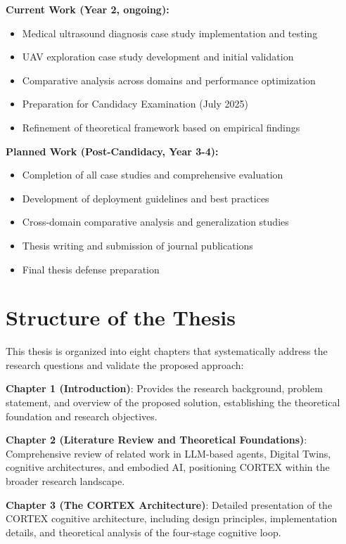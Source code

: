 \textbf{Current Work (Year 2, ongoing):}
\begin{itemize}
    \item Medical ultrasound diagnosis case study implementation and testing
    \item UAV exploration case study development and initial validation
    \item Comparative analysis across domains and performance optimization
    \item Preparation for Candidacy Examination (July 2025)
    \item Refinement of theoretical framework based on empirical findings
\end{itemize}

\textbf{Planned Work (Post-Candidacy, Year 3-4):}
\begin{itemize}
    \item Completion of all case studies and comprehensive evaluation
    \item Development of deployment guidelines and best practices
    \item Cross-domain comparative analysis and generalization studies
    \item Thesis writing and submission of journal publications
    \item Final thesis defense preparation
\end{itemize}

\section{Structure of the Thesis}

This thesis is organized into eight chapters that systematically address the research questions and validate the proposed approach:

\textbf{Chapter 1 (Introduction)}: Provides the research background, problem statement, and overview of the proposed solution, establishing the theoretical foundation and research objectives.

\textbf{Chapter 2 (Literature Review and Theoretical Foundations)}: Comprehensive review of related work in LLM-based agents, Digital Twins, cognitive architectures, and embodied AI, positioning CORTEX within the broader research landscape.

\textbf{Chapter 3 (The CORTEX Architecture)}: Detailed presentation of the CORTEX cognitive architecture, including design principles, implementation details, and theoretical analysis of the four-stage cognitive loop.

